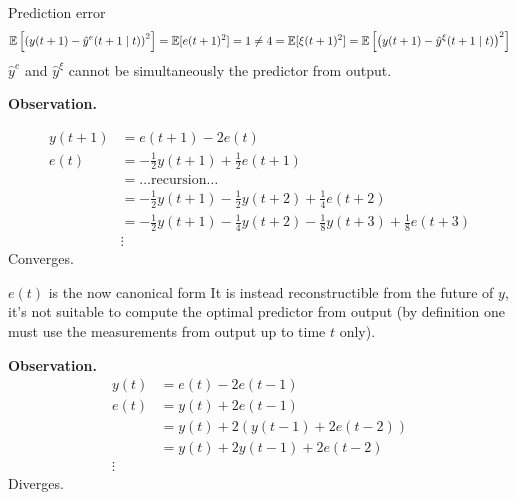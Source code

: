 Prediction error
\[
	\mathbb{E}\left[ \left( y(t+1)-\hat y^{e}(t+1\mid t)  \right) ^2   \right]  =\mathbb{E}[e(t+1)^2 ]=1\neq 4=\mathbb{E}[\xi(t+1)^2 ]=\mathbb{E}\left[ \left( y(t+1)-\hat y ^{\xi}(t+1\mid t)  \right)^2    \right]  
\]
$\hat y^{e} $ and $\hat y^{\xi} $ cannot be simultaneously the predictor from output.

\textbf{Observation.}

\begin{align*}
	y(t+1)&=e(t+1)-2e(t)\\
	e(t)&=-\frac{1}{2} y(t+1)+\frac{1}{2} e(t+1)\\
	&= \ldots \text{recursion}\ldots \\
	&= -\frac{1}{2} y(t+1)-\frac{1}{2} y(t+2)+\frac{1}{4}e(t+2)\\
	&=-\frac{1}{2} y(t+1)-\frac{1}{4}y(t+2)-\frac{1}{8}y(t+3)+\frac{1}{8}e(t+3)\\
	&\vdots
\end{align*}
Converges.

$e(t)$ is the now canonical form 
It is instead reconstructible from the future of $y$, it's not suitable to compute the optimal predictor from output (by definition one must use the measurements from output up to time $t$ only).

\textbf{Observation.}
\begin{align*}
	y(t)&=e(t)-2e(t-1)\\
	e(t)&=y(t)+2e(t-1)\\
	&=y(t)+2(y(t-1)+2e(t-2))\\
	&=y(t)+2y(t-1)+2e(t-2)\\
	\vdots
\end{align*}
Diverges.


